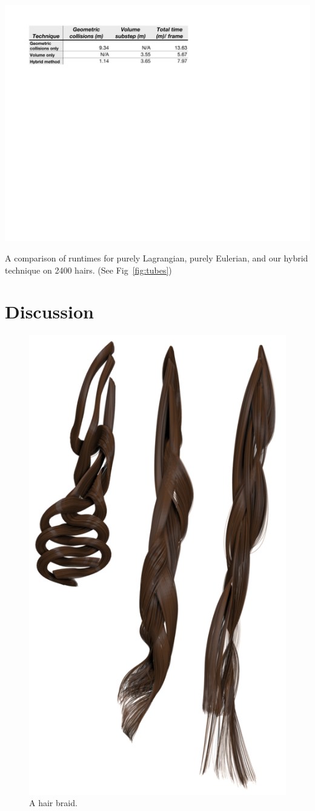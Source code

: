 \begin{table}[b!]
 \centering \includegraphics[width=.7\linewidth]{hair/figures/tube_times}
 \caption[Runtime comparison of collision algorithms.]{\label{table:tubes} A comparison of runtimes 
for purely Lagrangian,
   purely Eulerian, and our hybrid technique on 2400 hairs. (See Fig~\ref{fig:tubes})} 
\end{table}

\section{Discussion}

\begin{figure}[t]
\centering
\includegraphics[width=.45\columnwidth]{hair/images/braidfigurenew}
\caption{A hair braid.}\label{fig:braid}
\end{figure}

